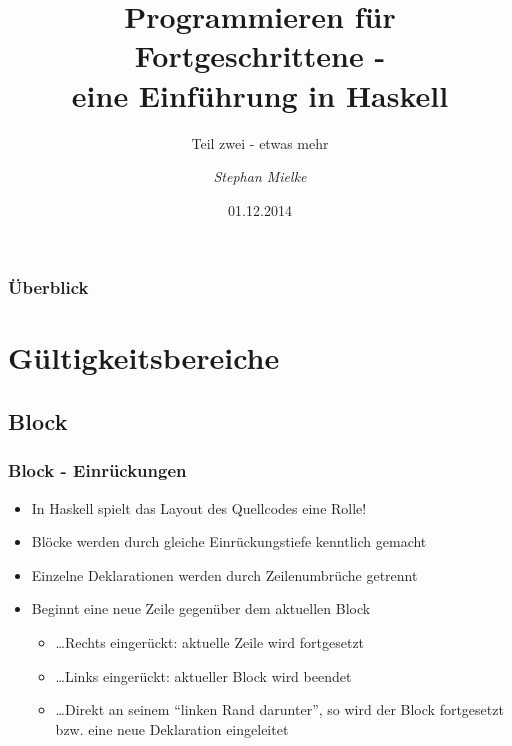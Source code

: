 \documentclass[fleqn,11pt,aspectratio=43]{beamer}
\title{Programmieren für Fortgeschrittene - \\eine Einführung in Haskell}
\author[Stephan Mielke]{\emph{Stephan Mielke}}
\institute[TU Braunschweig, IPS]{Technische Universität Braunschweig, IPS}
\begin{document}
\subtitle{Teil zwei - etwas mehr} 
\date{01.12.2014}

\begin{frame}
\titlepage
\end{frame}

\begin{frame}[noframenumbering]
  \scriptsize
  \frametitle{Überblick}  
    \tableofcontents[currentsection,sectionstyle=show, hideallsubsections]
\end{frame}


\section{Gültigkeitsbereiche~}
\subsection{Block}

\begin{frame}
\frametitle{Block - Einrückungen}
\begin{block}{\vspace*{-3ex}}
\begin{itemize}
  \item In Haskell spielt das Layout des Quellcodes eine Rolle!
  \item Blöcke werden durch gleiche Einrückungstiefe kenntlich gemacht
  \item Einzelne Deklarationen werden durch Zeilenumbrüche getrennt
  \item Beginnt eine neue Zeile gegenüber dem aktuellen Block 
  \begin{itemize}
    \item \dots Rechts eingerückt: aktuelle Zeile wird fortgesetzt
    \item \dots Links eingerückt: aktueller Block wird beendet
    \item \dots Direkt an seinem "`linken Rand darunter"', so wird der Block fortgesetzt bzw. eine neue Deklaration eingeleitet 
  \end{itemize}
\end{itemize}
\end{block}
\end{frame}
\end{document}

